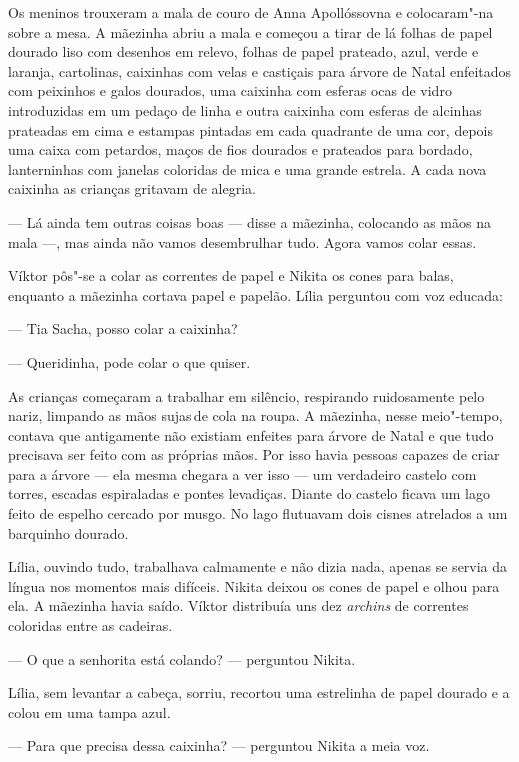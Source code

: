 Os meninos trouxeram a mala de couro de Anna Apollóssovna e colocaram"-na
sobre a mesa. A mãezinha abriu a mala e começou a tirar de lá folhas de
papel dourado liso com desenhos em relevo, folhas de papel prateado,
azul, verde e laranja, cartolinas, caixinhas com velas e castiçais para
árvore de Natal enfeitados com peixinhos e galos dourados, uma caixinha
com esferas ocas de vidro introduzidas em um pedaço de linha e outra
caixinha com esferas de alcinhas prateadas em cima e estampas pintadas
em cada quadrante de uma cor, depois uma caixa com petardos, maços de
fios dourados e prateados para bordado, lanterninhas com janelas
coloridas de mica e uma grande estrela. A cada nova caixinha as crianças
gritavam de alegria.

--- Lá ainda tem outras coisas boas --- disse a mãezinha, colocando as
mãos na mala ---, mas ainda não vamos desembrulhar tudo. Agora vamos
colar essas.

Víktor pôs"-se a colar as correntes de papel e Nikita os cones para
balas, enquanto a mãezinha cortava papel e papelão. Lília perguntou com
voz educada:

--- Tia Sacha, posso colar a caixinha?

--- Queridinha, pode colar o que quiser.

As crianças começaram a trabalhar em silêncio, respirando ruidosamente
pelo nariz, limpando as mãos sujas\,de cola na roupa. A mãezinha, nesse
meio"-tempo, contava que antigamente não existiam enfeites para árvore de
Natal e que tudo precisava ser feito com as próprias mãos. Por isso
havia pessoas capazes de criar para a árvore --- ela mesma chegara a ver
isso --- um verdadeiro castelo com torres, escadas espiraladas e pontes
levadiças. Diante do castelo ficava um lago feito de espelho cercado por
musgo. No lago flutuavam dois cisnes atrelados a um barquinho dourado.

Lília, ouvindo tudo, trabalhava calmamente e não dizia nada, apenas se
servia da língua nos momentos mais difíceis. Nikita deixou os cones de
papel e olhou para ela. A mãezinha havia saído. Víktor distribuía uns
dez \emph{archins} de correntes coloridas entre as cadeiras.

--- O que a senhorita está colando? --- perguntou Nikita.

Lília, sem levantar a cabeça, sorriu, recortou uma estrelinha de papel
dourado e a colou em uma tampa azul.

--- Para que precisa dessa caixinha? --- perguntou Nikita a meia voz.


